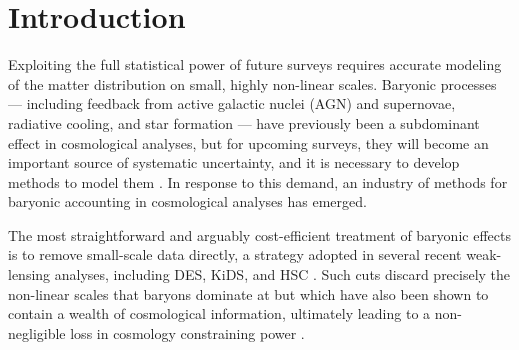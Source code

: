 \documentclass[linenumbers,trackchanges, twocolumn]{aastex701}
\begin{document}

\section{Introduction} 

Exploiting the full statistical power of future surveys requires accurate modeling of the matter distribution on small, highly non-linear scales. Baryonic processes --- including feedback from active galactic nuclei (AGN) and supernovae, radiative cooling, and star formation --- have previously been a subdominant effect in cosmological analyses, but for upcoming surveys, they will become an important source of systematic uncertainty, and it is necessary to develop methods to model them \citep[e.g.][]{Jing-2006,Chisari-2019,Schneider-2019}. In response to this demand, an industry of methods for baryonic accounting in cosmological analyses has emerged.

The most straightforward and arguably cost-efficient treatment of baryonic effects is to remove small-scale data directly, a strategy adopted in several recent weak-lensing analyses, including DES, KiDS, and HSC \citep[e.g.][]{Secco-2022,Li-2023,Dalal-2023}. Such cuts discard precisely the non-linear scales that baryons dominate at but which have also been shown to contain a wealth of cosmological information, ultimately leading to a non-negligible loss in cosmology constraining power \citep[e.g.][]{VillaescusaNavarro-2021a}.
\end{document}
